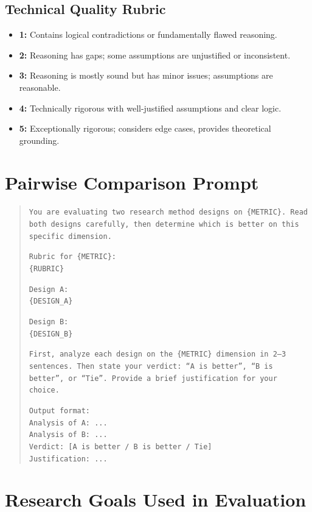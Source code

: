 \subsection{Technical Quality Rubric}
\begin{itemize}[leftmargin=*]
\item \textbf{1:} Contains logical contradictions or fundamentally flawed reasoning.
\item \textbf{2:} Reasoning has gaps; some assumptions are unjustified or inconsistent.
\item \textbf{3:} Reasoning is mostly sound but has minor issues; assumptions are reasonable.
\item \textbf{4:} Technically rigorous with well-justified assumptions and clear logic.
\item \textbf{5:} Exceptionally rigorous; considers edge cases, provides theoretical grounding.
\end{itemize}

\section{Pairwise Comparison Prompt}
\label{app:pairwise_prompt}

\begin{quote}
\small
\texttt{You are evaluating two research method designs on \{METRIC\}. Read both designs carefully, then determine which is better on this specific dimension.}

\texttt{Rubric for \{METRIC\}:}\\
\texttt{\{RUBRIC\}}

\texttt{Design A:}\\
\texttt{\{DESIGN\_A\}}

\texttt{Design B:}\\
\texttt{\{DESIGN\_B\}}

\texttt{First, analyze each design on the \{METRIC\} dimension in 2--3 sentences. Then state your verdict: ``A is better'', ``B is better'', or ``Tie''. Provide a brief justification for your choice.}

\texttt{Output format:}\\
\texttt{Analysis of A: ...}\\
\texttt{Analysis of B: ...}\\
\texttt{Verdict: [A is better / B is better / Tie]}\\
\texttt{Justification: ...}
\end{quote}

\section{Research Goals Used in Evaluation}
\label{app:goals}

